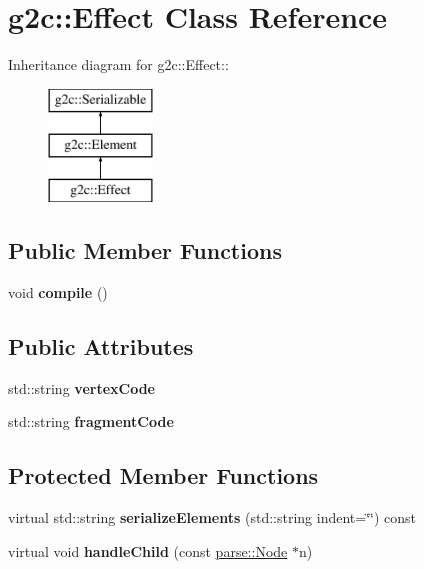 \hypertarget{classg2c_1_1_effect}{
\section{g2c::Effect Class Reference}
\label{classg2c_1_1_effect}
}
Inheritance diagram for g2c::Effect::\begin{figure}[H]
\begin{center}
\leavevmode
\includegraphics[height=3cm]{classg2c_1_1_effect}
\end{center}
\end{figure}
\subsection*{Public Member Functions}
\begin{DoxyCompactItemize}
\item 
\hypertarget{classg2c_1_1_effect_a45756da886e9c18f4ff413d9fe65b816}{
void {\bfseries compile} ()}
\label{classg2c_1_1_effect_a45756da886e9c18f4ff413d9fe65b816}

\end{DoxyCompactItemize}
\subsection*{Public Attributes}
\begin{DoxyCompactItemize}
\item 
\hypertarget{classg2c_1_1_effect_aae881ae57bd71da9ac5164c999e1ee81}{
std::string {\bfseries vertexCode}}
\label{classg2c_1_1_effect_aae881ae57bd71da9ac5164c999e1ee81}

\item 
\hypertarget{classg2c_1_1_effect_a3e199003cbbe8f3cc4fc1388538dcdd3}{
std::string {\bfseries fragmentCode}}
\label{classg2c_1_1_effect_a3e199003cbbe8f3cc4fc1388538dcdd3}

\end{DoxyCompactItemize}
\subsection*{Protected Member Functions}
\begin{DoxyCompactItemize}
\item 
\hypertarget{classg2c_1_1_effect_a408741daf26cb37c8da6153e6dfa505e}{
virtual std::string {\bfseries serializeElements} (std::string indent=\char`\"{}\char`\"{}) const }
\label{classg2c_1_1_effect_a408741daf26cb37c8da6153e6dfa505e}

\item 
\hypertarget{classg2c_1_1_effect_a30f051df920e9c81d81a775318e2d053}{
virtual void {\bfseries handleChild} (const \hyperlink{classparse_1_1_node}{parse::Node} $\ast$n)}
\label{classg2c_1_1_effect_a30f051df920e9c81d81a775318e2d053}

\end{DoxyCompactItemize}
